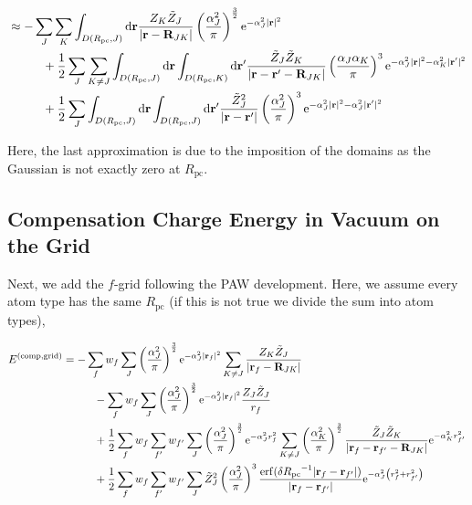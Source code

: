 \documentclass[paper=a4, fontsize=11pt]{article} %
\numberwithin{equation}{section} %
\numberwithin{figure}{section} %
\numberwithin{table}{section} %
\newcommand{\br}{{\bf{r}}}
\newcommand{\bR}{{\bf{R}}}
\newcommand{\re}{{\mathrm{e}}}
\newcommand{\rerf}{{\mathrm{erf}}}
\newcommand{\rd}{{\mathrm{d}}}
\newcommand{\rcomp}{{\mathrm{comp}}}
\newcommand{\al}{{\alpha}}
\newcommand{\Rpc}{{R_{\mathrm{pc}}}}
\begin{document}
\begin{equation}
\begin{split}
&\approx -\sum_J\sum_K \int_{D(\Rpc,J)} \rd \br   \frac{Z_K\tilde Z_J}{|\br - \bR_{JK}|}\left(\frac{\al_J^2}{\pi}\right)^{\frac{3}{2}}\re^{-\al_J^2|\br|^2}\\
&\hspace{10mm}+ \frac{1}{2}\sum_J\sum_{K \neq J}\int_{D(\Rpc,J)} \rd \br \int_{D(\Rpc,K)}\rd \br'  \frac{\tilde Z_J\tilde Z_K}{|\br-\br'-\bR_{JK}|}\left(\frac{\al_J\al_K}{\pi}\right)^3\re^{-\al_J^2|\br|^2-\al_K^2|\br'|^2}\\
&\hspace{10mm}+ \frac{1}{2}\sum_J\int_{D(\Rpc,J)} \rd \br \int_{D(\Rpc,J)}\rd \br'  \frac{\tilde Z_J^2}{|\br-\br'|}\left(\frac{\al_J^2}{\pi}\right)^3\re^{-\al_J^2|\br|^2-\al_J^2|\br'|^2}\\
\end{split}
\end{equation}



Here, the last approximation is due to the imposition of the domains as the Gaussian is not exactly zero at $\Rpc$. \\

\subsection{Compensation Charge Energy in Vacuum on the Grid}\label{sec:L2}
Next, we add the $f$-grid following the PAW development. Here, we assume every atom type has the same $\Rpc$ (if this is not true we divide the sum into atom types),

\begin{equation}
\begin{split}
E^{(\rcomp,\mathrm{grid})}
&= -\sum_f w_f \sum_J  \left(\frac{\al_J^2}{\pi}\right)^{\frac{3}{2}}\re^{-\al_J^2|\br_f|^2} \sum_{K \neq J} \frac{Z_K\tilde Z_J}{|\br_f - \bR_{JK}|}\\
&\hspace{10mm}-\sum_f w_f \sum_J  \left(\frac{\al_J^2}{\pi}\right)^{\frac{3}{2}}\re^{-\al_J^2|\br_f|^2} \frac{Z_J\tilde Z_J}{r_f}\\
&\hspace{10mm}+ \frac{1}{2}\sum_f w_f \sum_{f'} w_{f'} \sum_J \left(\frac{\al_J^2}{\pi}\right)^{\frac{3}{2}} \re^{-\al_J^2 r_f^2} \sum_{K \neq J} \left(\frac{\al_K^2}{\pi}\right)^{\frac{3}{2}} \frac{\tilde Z_J\tilde Z_K}{|\br_f-\br_{f'}-\bR_{JK}|} \re^{-\al_K^2 r_{f'}^2} \\
&\hspace{10mm}+ \frac{1}{2}\sum_f w_f \sum_{f'} w_{f'} \sum_J \tilde Z_J^2 \left(\frac{\al_J^2}{\pi}\right)^3 \frac{\rerf(\delta\Rpc^{-1}|\br_f - \br_{f'}|)}{|\br_f-\br_{f'}|}\re^{-\al_J^2 \left(r_f^2+r_{f'}^2\right)}\\
\end{split}
\end{equation}
\end{document}
